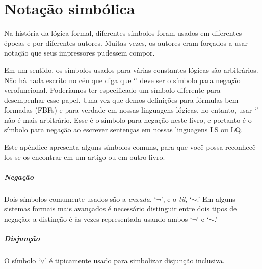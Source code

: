 \chapter[Outra notação simbólica]{Notação simbólica}
\label{app.notation}

Na história da lógica formal, diferentes símbolos foram usados em diferentes épocas e por diferentes autores. Muitas vezes, os autores eram forçados a usar notação que seus impressores pudessem compor.

Em um sentido, os símbolos usados para várias constantes lógicas são arbitrários. Não há nada escrito no céu que diga que `\enot' deve ser o símbolo para negação verofuncional. Poderíamos ter especificado um símbolo diferente para desempenhar esse papel. Uma vez que demos definições para fórmulas bem formadas (FBFs) e para verdade em nossas linguagens lógicas, no entanto, usar `\enot' não é mais arbitrário. Esse é o símbolo para negação neste livro, e portanto é o símbolo para negação ao escrever sentenças em nossas linguagens LS ou LQ.

Este apêndice apresenta alguns símbolos comuns, para que você possa reconhecê-los se os encontrar em um artigo ou em outro livro.

\paragraph{Negação} Dois símbolos comumente usados são a \emph{enxada}, `$\neg$', e o \emph{til}, `${\sim}$.' Em alguns sistemas formais mais avançados é necessário distinguir entre dois tipos de negação; a distinção é às vezes representada usando ambos `$\neg$' e `${\sim}$.'

\paragraph{Disjunção} O símbolo `$\vee$' é tipicamente usado para simbolizar disjunção inclusiva.

